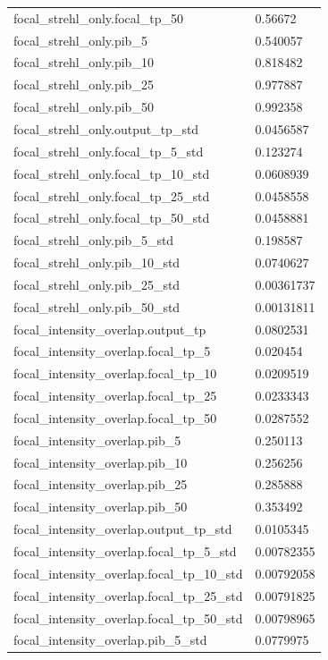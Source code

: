 \begin{longtable}{p{}p{}}
focal\_strehl\_only.focal\_tp\_50 & 0.56672\\
focal\_strehl\_only.pib\_5 & 0.540057\\
focal\_strehl\_only.pib\_10 & 0.818482\\
focal\_strehl\_only.pib\_25 & 0.977887\\
focal\_strehl\_only.pib\_50 & 0.992358\\
focal\_strehl\_only.output\_tp\_std & 0.0456587\\
focal\_strehl\_only.focal\_tp\_5\_std & 0.123274\\
focal\_strehl\_only.focal\_tp\_10\_std & 0.0608939\\
focal\_strehl\_only.focal\_tp\_25\_std & 0.0458558\\
focal\_strehl\_only.focal\_tp\_50\_std & 0.0458881\\
focal\_strehl\_only.pib\_5\_std & 0.198587\\
focal\_strehl\_only.pib\_10\_std & 0.0740627\\
focal\_strehl\_only.pib\_25\_std & 0.00361737\\
focal\_strehl\_only.pib\_50\_std & 0.00131811\\
focal\_intensity\_overlap.output\_tp & 0.0802531\\
focal\_intensity\_overlap.focal\_tp\_5 & 0.020454\\
focal\_intensity\_overlap.focal\_tp\_10 & 0.0209519\\
focal\_intensity\_overlap.focal\_tp\_25 & 0.0233343\\
focal\_intensity\_overlap.focal\_tp\_50 & 0.0287552\\
focal\_intensity\_overlap.pib\_5 & 0.250113\\
focal\_intensity\_overlap.pib\_10 & 0.256256\\
focal\_intensity\_overlap.pib\_25 & 0.285888\\
focal\_intensity\_overlap.pib\_50 & 0.353492\\
focal\_intensity\_overlap.output\_tp\_std & 0.0105345\\
focal\_intensity\_overlap.focal\_tp\_5\_std & 0.00782355\\
focal\_intensity\_overlap.focal\_tp\_10\_std & 0.00792058\\
focal\_intensity\_overlap.focal\_tp\_25\_std & 0.00791825\\
focal\_intensity\_overlap.focal\_tp\_50\_std & 0.00798965\\
focal\_intensity\_overlap.pib\_5\_std & 0.0779975\\

\end{longtable}
